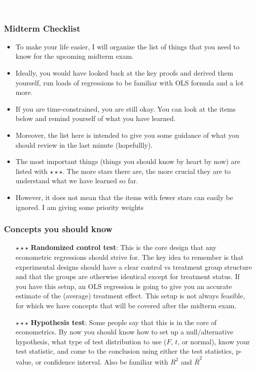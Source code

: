 \documentclass[aspectratio=169]{beamer}
\newenvironment{transitionframe}{\setbeamercolor{background canvas}{bg=Khaki}\setbeamertemplate{footline}{} \begin{frame}}{\end{frame}}
\begin{document}
\begin{transitionframe}
  \begin{center}
         { \Huge \textcolor{white}{Midterm checklistl}}
       \end{center}
\end{transitionframe}

\begin{frame}
\frametitle{Midterm Checklist}
\begin{itemize} 
\item To make your life easier, I will organize the list of things that you need to know for the upcoming midterm exam. 
\item Ideally, you would have looked back at the key proofs and derived them yourself, run loads of regressions to be familiar with OLS formula and a lot more.
\item If you are time-constrained, you are still okay. You can look at the items below and remind yourself of what you have learned.
\item Moreover, the list here is intended to give you some guidance of what you should review in the last minute (hopefullly). 
\item The most important things (things you should know by heart by now) are listed with $\star\star\star$. The more stars there are, the more crucial they are to understand what we have learned so far. 
\item However, it does not mean that the items with fewer stars can easily be ignored. I am giving some priority weights
\end{itemize}
\end{frame}

\begin{frame}
\frametitle{Concepts you should know}
\begin{itemize} 
\item[$\star\star\star$] \textbf{Randomized control test}: This is the core design that any econometric regressions should strive for. The key idea to remember is that experimental designs should have a clear control vs treatment group structure and that the groups are otherwise identical except for treatment status. If you have this setup, an OLS regression is going to give you an accurate estimate of the (average) treatment effect. This setup is not always feasible, for which we have concepts that will be covered after the midterm exam. 
\item[$\star\star\star$] \textbf{Hypothesis test}: Some people say that this is in the core of econometrics. By now you should know how to set up a null/alternative hypothesis, what type of test distribution to use ($F$, $t$, or normal), know your test statistic, and come to the conclusion using either the test statistics, p-value, or confidence interval. Also be familiar with $R^2$ and $\bar{R}^2$
\end{itemize}
\end{frame}
\end{document}
